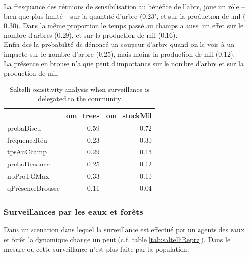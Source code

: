 \documentclass{article}
\begin{document}
        La fresquance des réunions de sensibilisation au bénéfice de l'abre, joue un rôle -- bien que plus limité -- sur la quantité d'arbre ($0.23$', et sur la production de mil ($0.30$). Dans la même proportion le temps passé au champs a aussi un effet sur le nombre d'arbres ($0.29$), et sur la production de mil ($0.16$).\\

        Enfin des la probabilité de dénoncé un coupeur d'arbre quand on le voie à un impacte sur le nombre d'arbre ($0.25$), mais moins la production de mil ($0.12$).\\

        La présence en brouse n'a que peut d'importance sur le nombre d'arbre et sur la production de mil. 

        \begin{table}
            \centering\begingroup\fontsize{10}{12}\selectfont
            
                \begin{tabular}[]{lrr}
                    \toprule
                    ~ & om\_trees & om\_stockMil\\
                    \hline
                    \addlinespace
                    probaDiscu & 0.59 & 0.72\\
                    fréquenceRéu & 0.23 & 0.30\\
                    tpsAuChamp & 0.29 & 0.16\\
                    probaDenonce & 0.25 & 0.12\\
                    nbProTGMax & 0.33 & 0.10\\
                    qPrésenceBrousse & 0.11 & 0.04\\
                    \bottomrule
                \end{tabular}
            \caption{Saltelli sensitivity analysis when surveillance is delegated to the community}
            \label{tab:saltelliCom}
            \endgroup{}
        \end{table}

    \subsubsection{Surveillances par les eaux et forêts}

        Dans un scenarion dans lequel la surveillance est effectué par un agents des eaux et forêt la dynamique change un peut (c.f. table \ref{tab:saltelliReprz}). Dans le mesure ou cette surveillance n'est plus faite par la population. 
\end{document}
